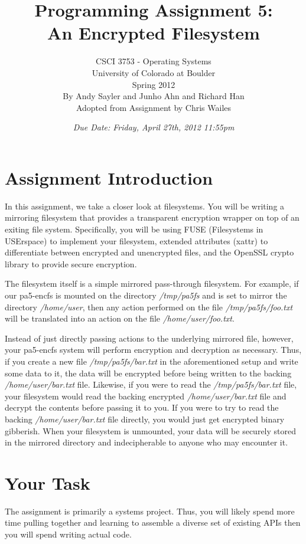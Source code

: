 \documentclass[12pt]{article}
\title{Programming Assignment 5:\\An Encrypted Filesystem}
\author{
  CSCI 3753 - Operating Systems\\
  University of Colorado at Boulder\\
  Spring 2012\\
  By Andy Sayler and Junho Ahn and Richard Han\\
  Adopted from Assignment by Chris Wailes
}
\date{\emph{Due Date: Friday, April 27th, 2012 11:55pm}}
\begin{document}
\maketitle

\section{Assignment Introduction}
In this assignment, we take a closer look at filesystems.
You will be writing a mirroring filesystem that provides a
transparent encryption wrapper on top of an exiting file system.
Specifically, you will be using FUSE\cite{fuse-website}
(Filesystems in USErspace) to implement your filesystem,
extended attributes (xattr) to differentiate between encrypted and
unencrypted files, and the OpenSSL\cite{openssl-website}
crypto\cite{openssl-evp} library to provide secure encryption.

The filesystem itself is a simple mirrored pass-through filesystem. For
example, if our pa5-encfs is mounted on the directory \textit{/tmp/pa5fs}
and is set to mirror the directory \textit{/home/user}, then any
action performed on the file \textit{/tmp/pa5fs/foo.txt}
will be translated into an action on the file
\textit{/home/user/foo.txt}.

Instead of just directly passing actions to the
underlying mirrored file, however, your pa5-encfs system will perform encryption
and decryption as necessary. Thus, if you create a new file
\textit{/tmp/pa5fs/bar.txt} in the aforementioned setup
and write some data to it, the data will
be encrypted before being written to the backing
\textit{/home/user/bar.txt} file. Likewise, if you were to read the
\textit{/tmp/pa5fs/bar.txt} file, your filesystem would read the backing encrypted
\textit{/home/user/bar.txt} file and decrypt the contents before
passing it to you. If you were to try to read
the backing \textit{/home/user/bar.txt} file directly, you would just
get encrypted binary gibberish. When your filesystem is unmounted,
your data will be securely stored in the mirrored directory
and indecipherable to anyone who may encounter it.

\section{Your Task}

The assignment is primarily a systems project. Thus, you will likely spend
more time pulling together and learning to assemble a diverse set of
existing APIs then you will spend writing actual code.
\end{document}
